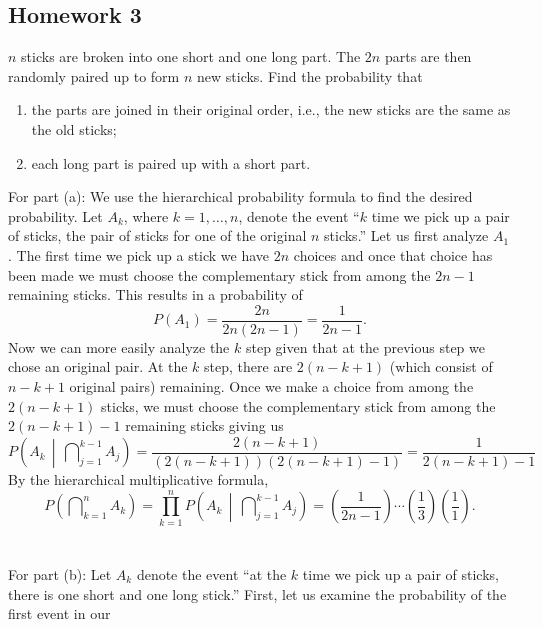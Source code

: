 \subsection{Homework 3}
\begin{problem}[Handout 3, \# 3]
  \(n\) sticks are broken into one short and one long part. The \(2n\)
  parts are then randomly paired up to form \(n\) new sticks. Find the
  probability that
  \begin{enumerate}[label=(\alph*),noitemsep]
  \item the parts are joined in their original order, i.e., the new sticks
    are the same as the old sticks;
  \item each long part is paired up with a short part.
  \end{enumerate}
\end{problem}
\begin{solution*}
  For part (a): We use the hierarchical probability formula to find the
  desired probability. Let \(A_k\), where \(k=1,\dotsc,n\), denote the
  event ``\(k\) time we pick up a pair of sticks, the pair of
  sticks for one of the original \(n\) sticks.'' Let us first analyze
  \(A_1\). The first time we pick up a stick we have \(2n\) choices and
  once that choice has been made we must choose the complementary stick
  from among the \(2n-1\) remaining sticks. This results in a probability
  of
  \[
    P(A_1)=\frac{2n}{2n(2n-1)}=\frac{1}{2n-1}.
  \]
  Now we can more easily analyze the \(k\) step given that at
  the previous step we chose an original pair. At the \(k\)
  step, there are \(2(n-k+1)\) (which consist of \(n-k+1\) original pairs)
  remaining. Once we make a choice from among the \(2(n-k+1)\) sticks, we
  must choose the complementary stick from among the \(2(n-k+1)-1\)
  remaining sticks giving us
  \[
    P\left(A_k\,\middle|\,\bigcap\nolimits_{j=1}^{k-1}A_j\right)=%
    \frac{2(n-k+1)}{(2(n-k+1))(2(n-k+1)-1)}=%
    \frac{1}{2(n-k+1)-1}
  \]
  By the hierarchical multiplicative formula,
  \[
    P\left(\bigcap\nolimits_{k=1}^n A_k\right)=%
    \prod_{k=1}^n P\left(A_k\,\middle|\,\bigcap\nolimits_{j=1}^{k-1}A_j\right)=%
    \left(\frac{1}{2n-1}\right)%
    \dotsm%
    \left(\frac{1}{3}\right)\left(\frac{1}{1}\right).
  \]
  \\\\
  For part (b): Let \(A_k\) denote the event ``at the \(k\)
  time we pick up a pair of sticks, there is one short and one long
  stick.'' First, let us examine the probability of the first event in our

\end{solution*}
